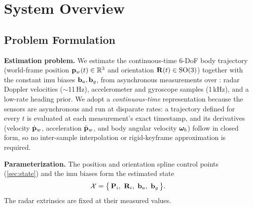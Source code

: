 \section{System Overview}
\label{sec:overview}

\subsection{Problem Formulation}
\label{sec:problem}

\textbf{Estimation problem.}
We estimate the continuous-time 6-DoF body trajectory (world-frame
position $\mathbf{p}_w(t)\in\mathbb{R}^3$ and orientation $\mathbf{R}(t)\in\mathrm{SO}(3)$)
together with the constant \ac{imu} biases $\mathbf{b}_a,\mathbf{b}_g$, from asynchronous
measurements over : radar Doppler velocities ($\sim$11\,Hz),
accelerometer and gyroscope samples (1\,kHz), and a low-rate heading
prior.  We adopt a \emph{continuous-time} representation because the
sensors are asynchronous and run at disparate rates: a trajectory defined
for every $t$ is evaluated at each measurement's exact timestamp, and its
derivatives (velocity $\dot{\mathbf{p}}_w$, acceleration $\ddot{\mathbf{p}}_w$, and
body angular velocity $\boldsymbol{\omega}_b$) follow in closed form, so no
inter-sample interpolation or rigid-keyframe approximation is required.

\textbf{Parameterization.}
The position and orientation spline control points
(\autoref{sec:state}) and the \ac{imu} biases form the estimated state
\begin{equation}
  \mathcal{X} = \bigl\{\,\mathbf{P}_i,\ \mathbf{R}_i,\ \mathbf{b}_a,\ \mathbf{b}_g\,\bigr\}.
  \label{eq:state}
\end{equation}
The radar extrinsics are fixed at their measured values.

